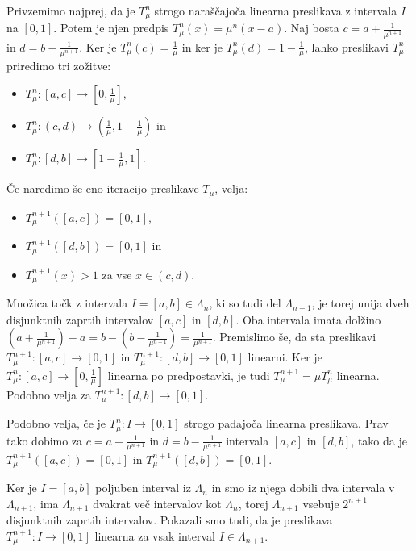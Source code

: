 \documentclass{isrmdelo}
\begin{document}
\begin{dokaz}
Privzemimo najprej, da je $T_\mu^n$ strogo naraščajoča linearna preslikava z intervala $I$ na $[0,1]$. Potem je njen predpis $T_\mu^n(x) = \mu^n (x-a)$. Naj bosta $c = a + \frac{1}{\mu^{n+1}}$ in $d = b - \frac{1}{\mu^{n+1}}$. Ker je $T_\mu^n(c) = \frac{1}{\mu}$ in ker je $T_\mu^n(d) = 1 - \frac{1}{\mu}$, lahko preslikavi $T_\mu^n$ priredimo tri zožitve:
\begin{itemize}
    \item $T_\mu^n : [a, c] \rightarrow [0, \frac{1}{\mu}]$,
    \item $T_\mu^n : (c, d) \rightarrow (\frac{1}{\mu}, 1-\frac{1}{\mu})$ in
    \item $T_\mu^n : [d, b] \rightarrow [1-\frac{1}{\mu}, 1]$.
\end{itemize}
Če naredimo še eno iteracijo preslikave $T_\mu$, velja:
\begin{itemize}
    \item $T_\mu^{n+1}([a, c]) = [0,1]$,
    \item $T_\mu^{n+1}([d, b]) = [0,1]$ in
    \item $T_\mu^{n+1}(x) > 1$ za vse $x \in (c, d)$.
\end{itemize}
Množica točk z intervala $I = [a,b] \in \Lambda_n$, ki so tudi del $\Lambda_{n+1}$, je torej unija dveh disjunktnih zaprtih intervalov $[a, c]$ in $[d, b]$. Oba intervala imata dolžino $(a + \frac{1}{\mu^{n+1}}) - a = b - (b - \frac{1}{\mu^{n+1}}) = \frac{1}{\mu^{n+1}}$. Premislimo še, da sta preslikavi $T_\mu^{n+1} : [a, c] \rightarrow [0, 1]$ in $T_\mu^{n+1} : [d, b] \rightarrow [0, 1]$ linearni. Ker je $T_\mu^n : [a, c] \rightarrow [0, \frac{1}{\mu}]$ linearna po predpostavki, je tudi $T_\mu^{n+1} = \mu T_\mu^n$ linearna. Podobno velja za $T_\mu^{n+1} : [d, b] \rightarrow [0, 1]$.

\medskip

Podobno velja, če je $T_\mu^n: I \rightarrow [0,1]$ strogo padajoča linearna preslikava. Prav tako dobimo za $c = a + \frac{1}{\mu^{n+1}}$ in $d = b - \frac{1}{\mu^{n+1}}$ intervala $[a,c]$ in $[d,b]$, tako da je $T_\mu^{n+1}([a, c]) = [0,1]$ in $T_\mu^{n+1}([d, b]) = [0,1]$.

\medskip

Ker je $I = [a,b]$ poljuben interval iz $\Lambda_n$ in smo iz njega dobili dva intervala v $\Lambda_{n+1}$, ima $\Lambda_{n+1}$ dvakrat več intervalov kot $\Lambda_n$, torej $\Lambda_{n+1}$ vsebuje $2^{n+1}$ disjunktnih zaprtih intervalov. Pokazali smo tudi, da je preslikava $T_\mu^{n+1}: I \rightarrow [0,1]$ linearna za vsak interval $I \in \Lambda_{n+1}$. \qedhere
\end{dokaz}
\end{document}

